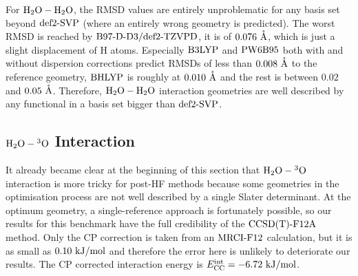 \documentclass[8.5pt,twoside,twocolumn]{article}
\renewcommand{\Ang}{\mathring{\te{A}}}
\newcommand\kmo{\enmat{\te {kJ/mol}}}
\theoremstyle{standard}
\begin{document}
For $\mbox{\ensuremath{\text H _2 \text O-\text H _2 \text O}}$, the RMSD values are entirely unproblematic for any basis set beyond
$\text{def2-SVP}$ (where an entirely wrong geometry is predicted). The worst RMSD is
reached by $\text{B97-D}\text{-D3}/\text{def2-TZVPD}$, it is of \mbox{$0.076\ \Ang$}, which is just a
slight displacement of H atoms. Especially $\text{B3LYP}$ and $\text{PW6B95}$ both with and
without dispersion corrections predict RMSDs of less than $0.008\ \Ang$ to the
reference geometry, $\text{BHLYP}$ is roughly at $0.010\ \Ang$ and the rest is
between $0.02$ and $0.05\ \Ang$. Therefore, $\mbox{\ensuremath{\text H _2 \text O-\text H _2 \text O}}$ interaction geometries
are well described by any functional in a basis set bigger than $\text{def2-SVP}$.


\subsection{$\mbox{\ensuremath{\text H _2 \text O-\hspace{.2pt} ^3\text{O}}}$ Interaction}

It already became clear at the beginning of this section that $\mbox{\ensuremath{\text H _2 \text O-\hspace{.2pt} ^3\text{O}}}$ interaction is
more tricky for post-HF methods because some geometries in the optimisation process
are not well described by a single Slater determinant. At the optimum geometry,
a single-reference approach is fortunately possible, so our results for this
benchmark have the full credibility of the $\text{CCSD(T)-F12A}$ method. Only the CP
correction is taken from an $\text{MRCI-F12}$ calculation, but it is as small as
\mbox{$0.10\ \kmo$} and therefore the error here is unlikely to deteriorate our
results. The CP corrected interaction energy is \mbox{$\ecc=-6.72\ \kmo$}.
\end{document}

